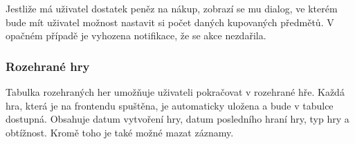 \documentclass[a4paper,oneside,12pt]{report}
\let\openright=\clearpage
\begin{document}
Jestliže má uživatel dostatek peněz na nákup, zobrazí se mu dialog, ve kterém bude mít uživatel možnost nastavit si počet daných kupovaných předmětů. V opačném případě je vyhozena notifikace, že se akce nezdařila.

\subsection{Rozehrané hry}
Tabulka rozehraných her umožňuje uživateli pokračovat v rozehrané hře. Každá hra, která je na frontendu spuštěna, je automaticky uložena a bude v tabulce dostupná. Obsahuje datum vytvoření hry, datum posledního hraní hry, typ hry a obtížnost. Kromě toho je také možné mazat záznamy. 

\chapter*{}
\setcounter{page}{6}




\listoffigures
\openright
\end{document}
